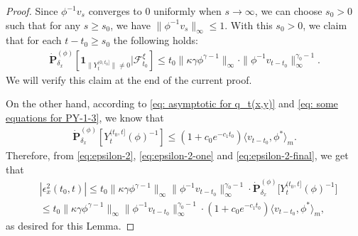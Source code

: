 \documentclass[12pt,a4paper]{amsart}
\theoremstyle{definition}
\numberwithin{equation}{section}
\begin{document}
\begin{proof}
Since $\phi^{-1}v_s$ converges to $0$ uniformly when $s\to \infty$, we can choose  $s_0>0$ such that for any $s\geq s_0$, we have $\|\phi^{-1}v_s\|_{\infty} \leq 1$.
With this $s_0>0$, we claim that for each $t - t_0\geq s_0$ the following holds:
\begin{align}
  \label{eq:epsilon-2-one}
  \dot{\mathbf P}_{\delta_x}^{(\phi)}[\mathbf 1_{\| Y_t^{(0,t_0]}\|\neq 0}|\mathscr F^\xi_{t_0}]
  \leq t_0\|\kappa \gamma \phi^{\gamma - 1}\|_\infty \cdot \|\phi^{-1}v_{t-t_0}\|^{\gamma_0-1}_\infty.
\end{align}
We will verify this claim at the end of the current proof.

On the other hand, according to \eqref{eq: asymptotic for q_t(x,y)} and \eqref{eq: some equations for PY-1-3}, we know that
\begin{align}\label{eq:epsilon-2-final}
	\dot{\mathbf P}_{\delta_x}^{(\phi)}[ Y^{(t_0,t]}_t(\phi)^{-1}]
	\leq (1+c_0 e^{-c_1 t_0}) \langle v_{t-t_0},\phi^* \rangle_m.
\end{align}
Therefore, from \eqref{eq:epsilon-2}, \eqref{eq:epsilon-2-one} and \eqref{eq:epsilon-2-final}, we get that
\begin{align}
&|\epsilon_x^2(t_0,t)| 
\leq t_0 \|\kappa \gamma \phi^{\gamma - 1}\|_\infty \|\phi^{-1} v_{t-t_0}\|_\infty^{\gamma_0 - 1} \cdot \dot{\mathbf P}_{\delta_x}^{(\phi)} \big[ Y_t^{(t_0, t]}(\phi)^{-1} \big]
\\ & \leq t_0 \|\kappa \gamma \phi^{\gamma - 1}\|_\infty \|\phi^{-1} v_{t-t_0}\|_\infty^{\gamma_0 - 1} \cdot (1+ c_0 e^{-c_1 t_0})\langle v_{t-t_0}, \phi^* \rangle_m,
\end{align}
as desired for this Lemma.


\end{proof}
\end{document}
